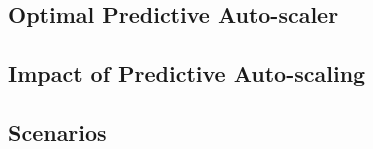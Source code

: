 \subsection{Optimal Predictive Auto-scaler}



\subsection{Impact of Predictive Auto-scaling}



\subsection{Scenarios}


